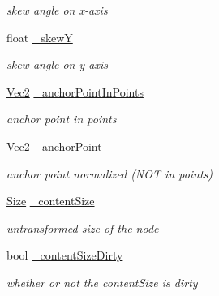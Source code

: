 \begin{DoxyCompactItemize}
\begin{DoxyCompactList}\small\item\em skew angle on x-\/axis \end{DoxyCompactList}\item 
\mbox{\label{classNode_afcc29d1e7bbb1914c2ff15b176399466}} 
float \hyperlink{classNode_afcc29d1e7bbb1914c2ff15b176399466}{\+\_\+skewY}
\begin{DoxyCompactList}\small\item\em skew angle on y-\/axis \end{DoxyCompactList}\item 
\mbox{\label{classNode_a1285aa9f824bf09f78751354c220402c}} 
\hyperlink{classVec2}{Vec2} \hyperlink{classNode_a1285aa9f824bf09f78751354c220402c}{\+\_\+anchor\+Point\+In\+Points}
\begin{DoxyCompactList}\small\item\em anchor point in points \end{DoxyCompactList}\item 
\mbox{\label{classNode_a366d7e4a0b945e889aef0f28b537c33b}} 
\hyperlink{classVec2}{Vec2} \hyperlink{classNode_a366d7e4a0b945e889aef0f28b537c33b}{\+\_\+anchor\+Point}
\begin{DoxyCompactList}\small\item\em anchor point normalized (N\+OT in points) \end{DoxyCompactList}\item 
\mbox{\label{classNode_add0e905f7ab31c19cc5667ceb1411932}} 
\hyperlink{classSize}{Size} \hyperlink{classNode_add0e905f7ab31c19cc5667ceb1411932}{\+\_\+content\+Size}
\begin{DoxyCompactList}\small\item\em untransformed size of the node \end{DoxyCompactList}\item 
\mbox{\label{classNode_a11f08d72282e6d4c0fae24e0cab56042}} 
bool \hyperlink{classNode_a11f08d72282e6d4c0fae24e0cab56042}{\+\_\+content\+Size\+Dirty}
\begin{DoxyCompactList}\small\item\em whether or not the content\+Size is dirty \end{DoxyCompactList}\item 

\end{DoxyCompactItemize}
